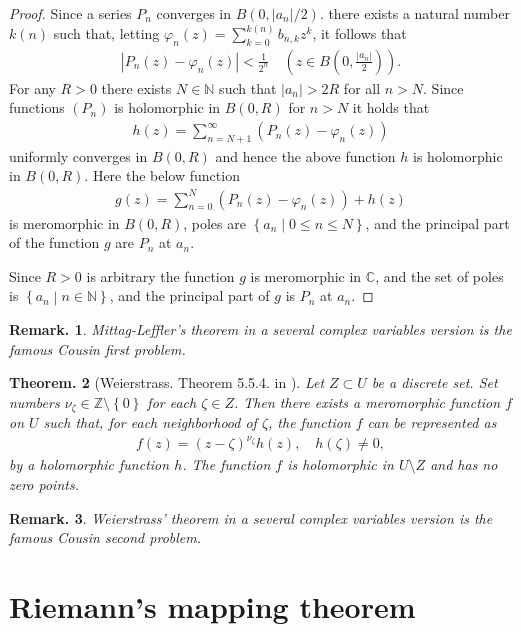 \documentclass[openany, a4paper, oneside]{jsbook}
\theoremstyle{break}
\newtheorem{thm}{Theorem.}[section]
\theoremstyle{breakdefn}
\newtheorem{rem}[thm]{Remark.}
\newcommand{\abs}[1]{\left|#1\right|}
\newcommand{\rbk}[1]{\left (#1\right)}
\newcommand{\cbk}[1]{\left\{#1\right\}}
\newcommand{\relmiddle}[1]{\mathrel{}\middle#1\mathrel{}}
\newcommand{\set}[2]{\left\{#1 \relmiddle| #2\right\}}
\newcommand{\bbC}{\mathbb{C}}
\newcommand{\bbN}{\mathbb{N}}
\newcommand{\bbZ}{\mathbb{Z}}
\begin{document}
\begin{proof}
Since a series $P_n$ converges in $B (0, \abs{a_n} / 2)$.
there exists a natural number $k (n)$ such that, letting $\varphi_n (z) = \sum_{k=0}^{k (n)} b_{n, k}z^k$, it follows that
\begin{align}
 \abs{P_n (z) - \varphi_n (z)}  < \frac{1}{2^n} \quad \rbk{z \in B (0, \frac{\abs{a_n}}{2})}.
\end{align}
For any $R>0$ there exists $N \in \bbN$ such that $\abs{a_n} > 2R$ for all $n > N$.
Since functions $(P_n)$ is holomorphic in $B (0,R)$ for $n > N$ it holds that
\begin{align}
 h (z)
 =
 \sum_{n = N + 1}^{\infty} \rbk{P_n (z) - \varphi_n (z)}
\end{align}
uniformly converges in $B (0, R)$ and hence the above function $h$ is holomorphic in $B (0, R)$.
Here the below function
\begin{align}
 g (z)
 =
 \sum_{n=0}^N \rbk{P_n (z) - \varphi_n (z)} + h (z)
\end{align}
is meromorphic in $B (0, R)$, poles are $\set{a_n}{0 \leq n \leq N}$,
and the principal part of the function $g$ are $P_n$ at $a_n$.

Since $R > 0$ is arbitrary the function $g$ is meromorphic in $\bbC$,
and the set of poles is $\set{a_n}{n \in \bbN}$,
and the principal part of $g$ is $P_n$ at $a_n$.
\end{proof}
\begin{rem}
 Mittag-Leffler's theorem in a several complex variables version is the famous Cousin first problem.
\end{rem}

\begin{thm}[Weierstrass. Theorem 5.5.4. in \cite{JunjiroNoguchi1}]
 Let $Z \subset U$ be a discrete set.
 Set numbers $\nu_{\zeta} \in \bbZ \setminus \cbk{0}$ for each $\zeta \in Z$.
 Then there exists a meromorphic function $f$ on $U$ such that, for each neighborhood of $\zeta$,
 the function $f$ can be represented as
 \begin{align}
  f (z)
  =
  (z - \zeta)^{\nu_{\zeta}} h (z), \quad h (\zeta) \neq 0,
 \end{align}
 by a holomorphic function $h$.
 The function $f$ is holomorphic in $U \setminus Z$ and has no zero points.
\end{thm}
\begin{rem}
 Weierstrass' theorem in a several complex variables version is the famous Cousin second problem.
\end{rem}
\section{Riemann's mapping theorem}
\end{document}
